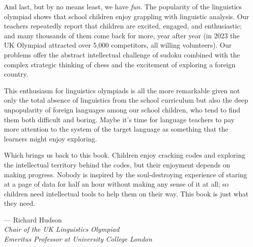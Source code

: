 And last, but by no means least, we have \textit{fun}.  The popularity of the linguistics olympiad shows that school children enjoy grappling with linguistic analysis. Our teachers repeatedly report that children are excited, engaged, and enthusiastic; and many thousands of them come back for more, year after year (in 2023 the UK Olympiad attracted over 5,000 competitors, all willing volunteers). Our problems offer the abstract intellectual challenge of sudoku combined with the complex strategic thinking of chess and the excitement of exploring a foreign country.
 
This enthusiasm for linguistics olympiads is all the more remarkable given not only the total absence of linguistics from the school curriculum but also the deep unpopularity of foreign languages among our school children, who tend to find them both difficult and boring. Maybe it's time for language teachers to pay more attention to the system of the target language as something that the learners might enjoy exploring.

Which brings us back to this book. Children enjoy cracking codes and exploring the intellectual territory behind the codes, but their enjoyment depends on making progress. Nobody is inspired by the soul-destroying experience of staring at a page of data for half an hour without making any sense of it at all; so children need intellectual tools to help them on their way. This book is just what they need.

\begin{flushright}--- Richard Hudson \\ 
\textit{Chair of the UK Linguistics Olympiad \\
Emeritus Professor at University College London} \end{flushright}
